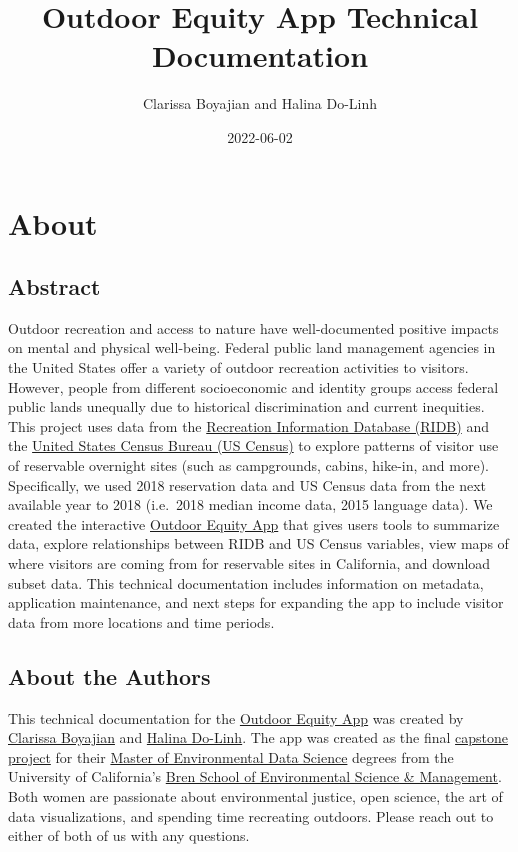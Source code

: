 \documentclass[
]{book}
\title{Outdoor Equity App Technical Documentation}
\author{Clarissa Boyajian and Halina Do-Linh}
\date{2022-06-02}
\begin{document}
\maketitle

{
\setcounter{tocdepth}{1}
\tableofcontents
}
\hypertarget{about}{%
\chapter{About}\label{about}}

\hypertarget{abstract}{%
\section{Abstract}\label{abstract}}

Outdoor recreation and access to nature have well-documented positive impacts on mental and physical well-being. Federal public land management agencies in the United States offer a variety of outdoor recreation activities to visitors. However, people from different socioeconomic and identity groups access federal public lands unequally due to historical discrimination and current inequities. This project uses data from the \href{https://ridb.recreation.gov/landing}{Recreation Information Database (RIDB)} and the \href{https://www.census.gov/data.html}{United States Census Bureau (US Census)} to explore patterns of visitor use of reservable overnight sites (such as campgrounds, cabins, hike-in, and more). Specifically, we used 2018 reservation data and US Census data from the next available year to 2018 (i.e.~2018 median income data, 2015 language data). We created the interactive \href{https://shinyapps.bren.ucsb.edu/oe_app/}{Outdoor Equity App} that gives users tools to summarize data, explore relationships between RIDB and US Census variables, view maps of where visitors are coming from for reservable sites in California, and download subset data. This technical documentation includes information on metadata, application maintenance, and next steps for expanding the app to include visitor data from more locations and time periods.

\hypertarget{about-the-authors}{%
\section{About the Authors}\label{about-the-authors}}

This technical documentation for the \href{https://shinyapps.bren.ucsb.edu/oe_app/}{Outdoor Equity App} was created by \href{https://cboyajian.github.io/}{Clarissa Boyajian} and \href{https://hdolinh.github.io/}{Halina Do-Linh}. The app was created as the final \href{https://bren.ucsb.edu/projects/visualizing-visitor-use-trends-california-campsites-explore-equitable-access}{capstone project} for their \href{https://bren.ucsb.edu/masters-programs/master-environmental-data-science}{Master of Environmental Data Science} degrees from the University of California's \href{https://bren.ucsb.edu/}{Bren School of Environmental Science \& Management}. Both women are passionate about environmental justice, open science, the art of data visualizations, and spending time recreating outdoors. Please reach out to either of both of us with any questions.
\end{document}

